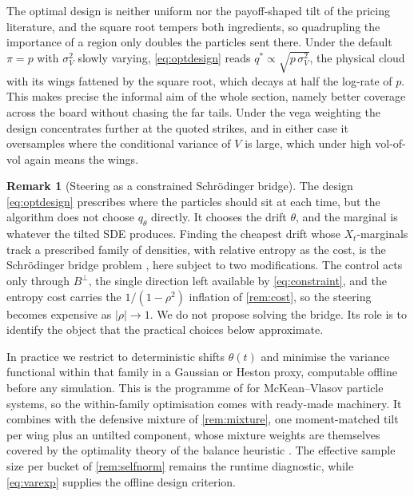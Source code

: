 \documentclass[11pt,a4paper]{article}
\theoremstyle{plain}
\theoremstyle{definition}
\theoremstyle{definition}
\newtheorem{remark}[theorem]{Remark}
\newcommand{\abs}[1]{\left\lvert #1 \right\rvert}
\begin{document}
The optimal design is neither uniform nor the payoff-shaped tilt of the pricing literature, and the square root tempers both ingredients, so quadrupling the importance of a region only doubles the particles sent there. Under the default $\pi = p$ with $\sigma_V^2$ slowly varying, \cref{eq:optdesign} reads $q^* \propto \sqrt{p\,\sigma_V^2}$, the physical cloud with its wings fattened by the square root, which decays at half the log-rate of $p$. This makes precise the informal aim of the whole section, namely better coverage across the board without chasing the far tails. Under the vega weighting the design concentrates further at the quoted strikes, and in either case it oversamples where the conditional variance of $V$ is large, which under high vol-of-vol again means the wings.

\begin{remark}[Steering as a constrained Schr\"odinger bridge]\label{rem:bridge}
The design \cref{eq:optdesign} prescribes where the particles should sit at each time, but the algorithm does not choose $q_\theta$ directly. It chooses the drift $\theta$, and the marginal is whatever the tilted SDE produces. Finding the cheapest drift whose $X_t$-marginals track a prescribed family of densities, with relative entropy as the cost, is the Schr\"odinger bridge problem \citep{leonard2014}, here subject to two modifications. The control acts only through $B^\perp$, the single direction left available by \cref{eq:constraint}, and the entropy cost carries the $1/(1-\rho^2)$ inflation of \cref{rem:cost}, so the steering becomes expensive as $\abs{\rho} \to 1$. We do not propose solving the bridge. Its role is to identify the object that the practical choices below approximate.
\end{remark}

In practice we restrict to deterministic shifts $\theta(t)$ and minimise the variance functional within that family in a Gaussian or Heston proxy, computable offline before any simulation. This is the programme of \citet{dosreis2023} for McKean--Vlasov particle systems, so the within-family optimisation comes with ready-made machinery. It combines with the defensive mixture of \cref{rem:mixture}, one moment-matched tilt per wing plus an untilted component, whose mixture weights are themselves covered by the optimality theory of the balance heuristic \citep{veach1995,owen2000}. The effective sample size per bucket of \cref{rem:selfnorm} remains the runtime diagnostic, while \cref{eq:varexp} supplies the offline design criterion.
\end{document}
